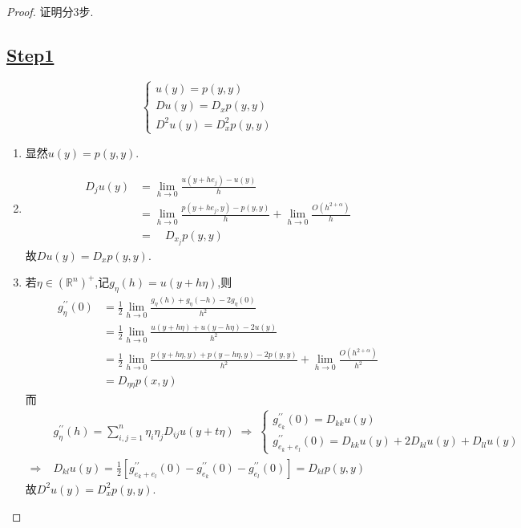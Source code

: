 \documentclass[12pt,A4paper,reqno]{amsart}
\numberwithin{equation}{section}
\theoremstyle{plain}
\theoremstyle{plain}
\theoremstyle{plain}
\numberwithin{equation}{section}
\theoremstyle{remark}
\begin{document}
\begin{proof}
	证明分3步.
	\subsection*{\underline{Step1}\vspace{-0.5cm}}
	$$\begin{cases}
	u(y)=p(y, y)\\
	D u(y)=D_{x} p(y, y)\\
	D^{2} u(y)=D_{x}^{2} p(y, y)
	\end{cases}$$
	\begin{enumerate}
		\item 显然$u(y)=p(y, y)$.
		\item \begin{equation*}
		\begin{aligned}
			D_{j} u(y)&=\lim _{h \rightarrow 0} \frac{u\left(y+h e_{j}\right)-u(y)}{h}\\
			&=\lim _{h \rightarrow 0} \frac{p\left(y+h e_{j}, y\right)-p(y, y)}{h}+\lim _{h \rightarrow 0} \frac{O\left(h^{2+\alpha}\right)}{h}\\
			&=\quad D_{x_{j}} p(y, y)
		\end{aligned}
		\end{equation*}
		故$D u(y)=D_{x} p(y, y)$.
		\item 若$\eta \in (\mathbb{R}^{n})^{+} $,记$g_{\eta}(h)=u(y+h \eta)$,则
		\begin{equation*}
		\begin{aligned}
		g_{\eta}^{\prime \prime}(0)&=\frac{1}{2} \lim _{h \rightarrow 0} \frac{g_{\eta}(h)+g_{\eta}(-h)-2 g_{\eta}(0)}{h^{2}}\\
		&=\frac{1}{2} \lim _{h \rightarrow 0} \frac{u(y+h \eta)+u(y-h \eta)-2 u(y)}{h^{2}}\\
		&=\frac{1}{2} \lim _{h \rightarrow 0} \frac{p(y+h \eta, y)+p(y-h \eta, y)-2 p(y, y)}{h^{2}}+\lim _{h \rightarrow 0} \frac{O\left(h^{2+\alpha}\right)}{h^{2}}\\
		&=D_{\eta \eta} p(x, y)
		\end{aligned}
		\end{equation*}
		而
		\begin{equation*}
		\begin{aligned}
		&g_{\eta}^{\prime \prime}(h)=\sum_{i, j=1}^{n} \eta_{i} \eta_{j} D_{i j} u(y+t \eta)\;\Rightarrow\; \begin{cases}
		g_{e_{k}}^{\prime \prime}(0)=D_{k k} u(y)\\
		g_{e_{k}+e_{l}}^{\prime \prime}(0)=D_{k k} u(y)+2 D_{k l} u(y)+D_{l l} u(y)
		\end{cases}\\
		\Rightarrow\;&D_{k l}
		 u(y)=\frac{1}{2}\left[g_{e_{k}+e_{l}}^{\prime \prime}(0)-g_{e_{k}}^{\prime \prime}(0)-g_{e_{l}}^{\prime \prime}(0)\right]=D_{kl}p(y,y)
		\end{aligned}
		\end{equation*}
		故$D^{2} u(y)=D_{x}^{2} p(y, y)$.
	\end{enumerate}

\end{proof}
\end{document}
